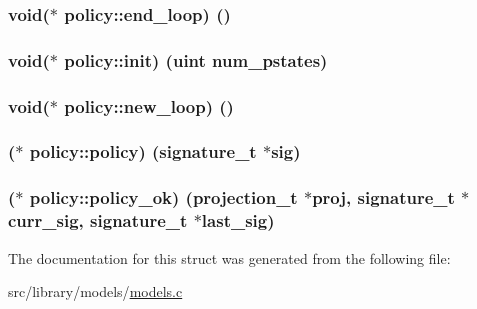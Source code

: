 \subsubsection[{\texorpdfstring{end\+\_\+loop}{end_loop}}]{\setlength{\rightskip}{0pt plus 5cm}void($\ast$ policy\+::end\+\_\+loop) ()}\hypertarget{structpolicy_a2e7ced29d27efca9a3d90ffc8fe0226e}{}\label{structpolicy_a2e7ced29d27efca9a3d90ffc8fe0226e}
\subsubsection[{\texorpdfstring{init}{init}}]{\setlength{\rightskip}{0pt plus 5cm}void($\ast$ policy\+::init) ({\bf uint} {\bf num\+\_\+pstates})}\hypertarget{structpolicy_ade5ad6f0239e34d13826497fd72d917e}{}\label{structpolicy_ade5ad6f0239e34d13826497fd72d917e}
\subsubsection[{\texorpdfstring{new\+\_\+loop}{new_loop}}]{\setlength{\rightskip}{0pt plus 5cm}void($\ast$ policy\+::new\+\_\+loop) ()}\hypertarget{structpolicy_a9bb8e49f1796876238623460ff349ebf}{}\label{structpolicy_a9bb8e49f1796876238623460ff349ebf}
\subsubsection[{\texorpdfstring{policy}{policy}}]{($\ast$ policy\+::policy) ({\bf signature\+\_\+t} $\ast$sig)}\hypertarget{structpolicy_a9c08472eff148dd22c31f1b733dfed60}{}\label{structpolicy_a9c08472eff148dd22c31f1b733dfed60}
\subsubsection[{\texorpdfstring{policy\+\_\+ok}{policy_ok}}]{($\ast$ policy\+::policy\+\_\+ok) ({\bf projection\+\_\+t} $\ast$proj, {\bf signature\+\_\+t} $\ast$curr\+\_\+sig, {\bf signature\+\_\+t} $\ast$last\+\_\+sig)}\hypertarget{structpolicy_a5be97c21f646a597063e280cbcaec128}{}\label{structpolicy_a5be97c21f646a597063e280cbcaec128}


The documentation for this struct was generated from the following file\+:\begin{DoxyCompactItemize}
\item 
src/library/models/\hyperlink{models_8c}{models.\+c}\end{DoxyCompactItemize}
